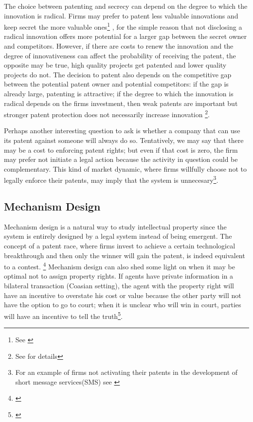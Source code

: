 The choice between patenting and secrecy can depend on the degree to which the innovation is radical. Firms may prefer to patent less valuable innovations and keep secret the more valuable ones\footnote{See \cite{Anton2004}} , for the simple reason that not disclosing a radical innovation offers more potential for a larger gap between the secret owner and competitors. However, if there are costs to renew the innovation and the degree of innovativeness can affect the probability of receiving the patent, the opposite may be true, high quality projects get patented and lower quality projects do not\citep{Mose2011}. The decision to patent also depends on the competitive gap between the potential patent owner and potential competitors: if the gap is already large, patenting is attractive; if the degree to which the innovation is radical depends on the firms investment, then weak patents are important but stronger patent protection does not necessarily increase innovation \footnote{See \cite{Kultti2006} for details}. %

Perhaps another interesting question to ask is whether a company that can use its patent against someone will always do so. Tentatively, we may say that there may be a cost to enforcing patent rights; but even if that cost is zero, the firm may prefer not initiate a legal action because the activity in question could be complementary. This kind of market dynamic, where firms willfully choose not to legally enforce their patents, may imply that the system is unnecesary\footnote{For an example of firms not activating their patents in the development of short message services(SMS) see \cite{corrocher2013development}}.

\subsection{Mechanism Design}

Mechanism design is a natural way to study intellectual property since the system is entirely designed by a legal system instead of being emergent. The concept of a patent race, where firms invest to achieve a certain technological breakthrough and then only the winner will gain the patent, is indeed equivalent to a contest. \footnote{ \cite{Games2003} } Mechanism design can also shed some light on when it may be optimal not to assign property rights. If agents have private information in a bilateral transaction (Coasian setting), the agent with the property right will have an incentive to overstate his cost or value because the other party will not have the option to go to court; when it is unclear who will win in court, parties will have an incentive to tell the truth\footnote{\cite{schmitz2001coase}}.

